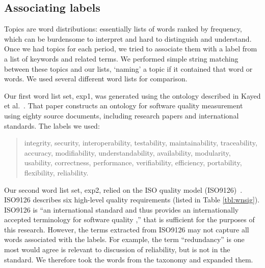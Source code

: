 \documentclass{acm_proc_article-sp}
\begin{document}
\subsection{Associating labels}

Topics are word distributions: essentially lists of words ranked by frequency, which can be burdensome to interpret and hard to distinguish and understand.
Once we had topics for each period, we tried to associate them with a label from a list of keywords and related terms. We performed simple string matching between these topics and our lists, `naming' a topic if it contained that word or words. We used several different word lists for comparison. 


Our first word list set, \textsf{exp1}, was generated using the ontology described in Kayed et al.~\cite{5072519}. That paper constructs an ontology for software quality measurement using eighty source documents, including research papers and international standards. The labels we used:
\begin{quotation}
\small \noindent \textsf{
integrity, security,
interoperability, testability, maintainability, traceability,
accuracy, modifiability, understandability, availability, modularity,
usability, correctness, performance, verifiability, efficiency,
portability, flexibility, reliability.
}
\end{quotation}

Our second word list set, \textsf{exp2}, relied on the ISO quality model (ISO9126)~\cite{iso9126}. ISO9126 describes six high-level quality requirements (listed in Table \ref{tbl:wnsig}). 
ISO9126 is ``an international standard and thus provides an internationally accepted terminology for software quality \cite[p. 58]{Bøegh2008},'' that is sufficient for the purposes of this research.
However, the terms extracted from ISO9126 may not capture all words associated with the labels.  For example, the term ``redundancy'' is one most would agree is relevant to discussion of reliability, but is not in the standard. We therefore took the words from the taxonomy and expanded them.
\end{document}

